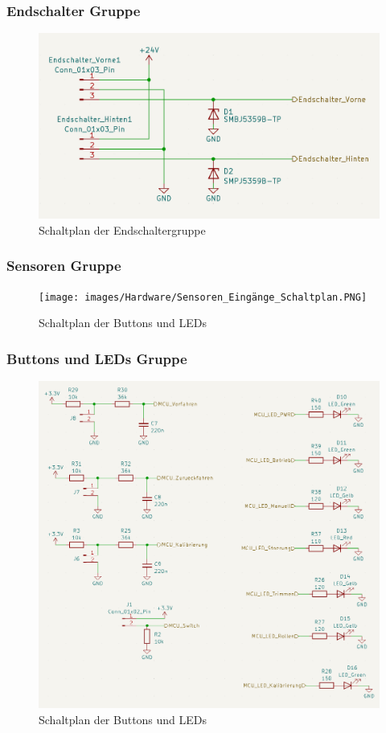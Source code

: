 \subsubsection{Endschalter Gruppe}
\begin{figure}[H]
	\centering
	\includegraphics[width=1.0\textwidth]{images/Hardware/Endschalter_Schaltplan.PNG}
	\caption{Schaltplan der Endschaltergruppe}
	\label{fig:Endschalter_gruppe}
\end{figure}
\subsubsection{Sensoren Gruppe}
\begin{figure}[H]
	\centering
	\texttt{[image: images/Hardware/Sensoren\_Eingänge\_Schaltplan.PNG]}
		\caption{Schaltplan der Buttons und LEDs}
	\label{fig:Sensoren_Gruppe}
\end{figure}
\subsubsection{Buttons und LEDs Gruppe}
\begin{figure}[H]
	\centering
	\includegraphics[width=1.0\textwidth]{images/Hardware/LEDS_und_buttons_schaltplan.PNG}
	\caption{Schaltplan der Buttons und LEDs}
	\label{fig:HMI_Gruppe}
\end{figure}
